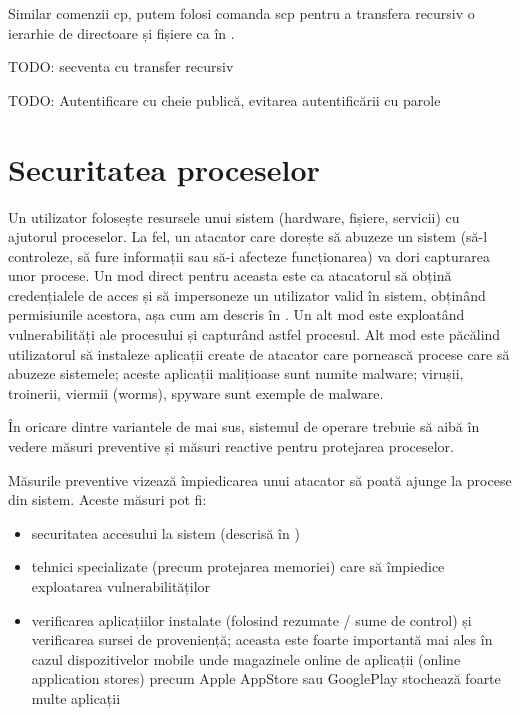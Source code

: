 Similar comenzii cp, putem folosi comanda scp pentru a transfera recursiv o ierarhie de directoare și fișiere ca în .

\begin{screen}[caption={Transfer recursiv prin SSH (scp)},label={lst:sec:scp-recursive}]
TODO: secventa cu transfer recursiv
\end{screen}

TODO: Autentificare cu cheie publică, evitarea autentificării cu parole

\section{Securitatea proceselor}
\label{sec:sec:process}

Un utilizator folosește resursele unui sistem (hardware, fișiere, servicii) cu ajutorul proceselor. La fel, un atacator care dorește să abuzeze un sistem (să-l controleze, să fure informații sau să-i afecteze funcționarea) va dori capturarea unor procese. Un mod direct pentru aceasta este ca atacatorul să obțină credențialele de acces și să impersoneze un utilizator valid în sistem, obținând permisiunile acestora, așa cum am descris în . Un alt mod este exploatând vulnerabilități ale procesului și capturând astfel procesul. Alt mod este păcălind utilizatorul să instaleze aplicații create de atacator care pornească procese care să abuzeze sistemele; aceste aplicații malițioase sunt numite malware; virușii, troinerii, viermii (worms), spyware sunt exemple de malware.

În oricare dintre variantele de mai sus, sistemul de operare trebuie să aibă în vedere măsuri preventive și măsuri reactive pentru protejarea proceselor.

Măsurile preventive vizează împiedicarea unui atacator să poată ajunge la procese din sistem. Aceste măsuri pot fi:

\begin{itemize}
  \item securitatea accesului la sistem (descrisă în )
  \item tehnici specializate (precum protejarea memoriei) care să împiedice exploatarea vulnerabilităților
  \item verificarea aplicațiilor instalate (folosind rezumate / sume de control) și verificarea sursei de proveniență; aceasta este foarte importantă mai ales în cazul dispozitivelor mobile unde magazinele online de aplicații (online application stores) precum Apple AppStore sau GooglePlay stochează foarte multe aplicații
\end{itemize}


